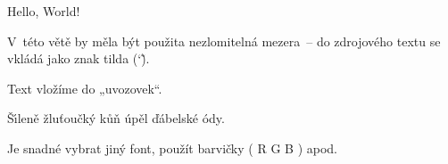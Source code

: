 \documentclass[a4paper,12pt]{article}
\begin{document}
\textenglish{Hello, World!}

V~této větě by měla být použita nezlomitelná mezera~-- do 
zdrojového textu se vkládá jako znak tilda (\char`\~).

Text vložíme do „uvozovek“.

\v{S}\'{\i}len\v{e} \v{z}lu\v{t}ou\v{c}k\'{y} k\r{u}\v{n}
\'{u}p\v{e}l \v{d}\'{a}belsk\'{e} \'{o}dy.

Je snadné vybrat { jiný font}, 
použít barvičky (%
{R}%
{G}%
{B}%
) apod.

\end{document}
